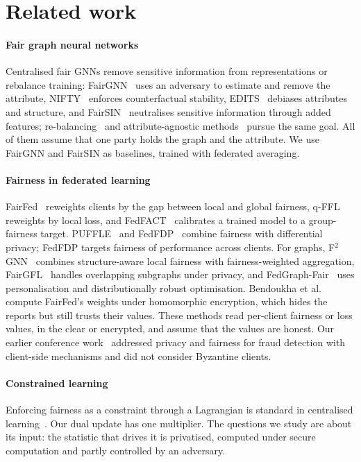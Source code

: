 \section{Related work}\label{sec:related}

\paragraph{Fair graph neural networks}
Centralised fair GNNs remove sensitive information from representations or rebalance training: FairGNN~\citep{dai2021say} uses an adversary to estimate and remove the attribute, NIFTY~\citep{agarwal2021towards} enforces counterfactual stability, EDITS~\citep{dong2022edits} debiases attributes and structure, and FairSIN~\citep{yang2024fairsin} neutralises sensitive information through added features; re-balancing~\citep{li2024fairgb} and attribute-agnostic methods~\citep{zhu2024fairinv} pursue the same goal. All of them assume that one party holds the graph and the attribute. We use FairGNN and FairSIN as baselines, trained with federated averaging.

\paragraph{Fairness in federated learning}
FairFed~\citep{ezzeldin2023fairfed} reweights clients by the gap between local and global fairness, q-FFL~\citep{li2020fair} reweights by local loss, and FedFACT~\citep{fedfact2025} calibrates a trained model to a group-fairness target. PUFFLE~\citep{corbucci2024puffle} and FedFDP~\citep{ling2024feddp} combine fairness with differential privacy; FedFDP targets fairness of performance across clients. For graphs, F$^2$GNN~\citep{f2gnn2023} combines structure-aware local fairness with fairness-weighted aggregation, FairGFL~\citep{fairgfl2026} handles overlapping subgraphs under privacy, and FedGraph-Fair~\citep{fedgraphfair2026} uses personalisation and distributionally robust optimisation. Bendoukha et al.~\citep{bendoukha2025popets} compute FairFed's weights under homomorphic encryption, which hides the reports but still trusts their values. These methods read per-client fairness or loss values, in the clear or encrypted, and assume that the values are honest. Our earlier conference work~\citep{dang2026fedfairgnn} addressed privacy and fairness for fraud detection with client-side mechanisms and did not consider Byzantine clients.

\paragraph{Constrained learning}
Enforcing fairness as a constraint through a Lagrangian is standard in centralised learning~\citep{cotter2019optimization}. Our dual update has one multiplier. The questions we study are about its input: the statistic that drives it is privatised, computed under secure computation and partly controlled by an adversary.

